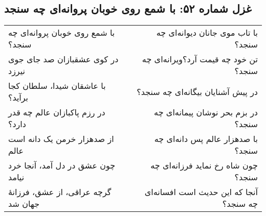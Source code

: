 \begin{center}
\section*{غزل شماره ۵۲: با شمع روی خوبان پروانه‌ای چه سنجد}
\label{sec:052}
\begin{longtable}{l p{0.5cm} r}
با شمع روی خوبان پروانه‌ای چه سنجد؟
&&
با تاب موی جانان دیوانه‌ای چه سنجد؟
\\
در کوی عشقبازان صد جای جوی نیرزد
&&
تن خود چه قیمت آرد؟ویرانه‌ای چه سنجد؟
\\
با عاشقان شیدا، سلطان کجا برآید؟
&&
در پیش آشنایان بیگانه‌ای چه سنجد؟
\\
در رزم پاکبازان عالم چه قدر دارد؟
&&
در بزم بحر نوشان پیمانه‌ای چه سنجد؟
\\
از صدهزار خرمن یک دانه است عالم
&&
با صدهزار عالم پس دانه‌ای چه سنجد؟
\\
چون عشق در دل آمد، آنجا خرد نیامد
&&
چون شاه رخ نماید فرزانه‌ای چه سنجد؟
\\
گرچه عراقی، از عشق، فرزانهٔ جهان شد
&&
آنجا که این حدیث است افسانه‌ای چه سنجد؟
\\
\end{longtable}
\end{center}
